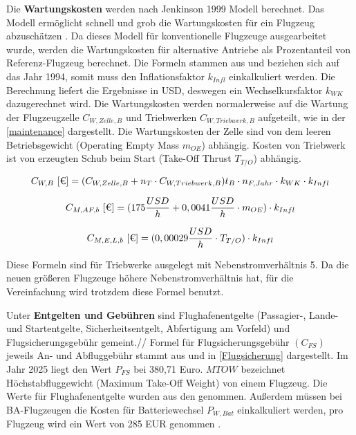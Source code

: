 Die \textbf{Wartungskosten} werden nach Jenkinson 1999 Modell berechnet. Das Modell ermöglicht schnell und grob die Wartungskosten 
für ein Flugzeug abzuschätzen \cite{bruge2018wartungskosten}.
Da dieses Modell für konventionelle Flugzeuge ausgearbeitet wurde, werden die Wartungskosten für alternative Antriebe
als Prozentanteil von Referenz-Flugzeug berechnet. 
Die Formeln stammen aus \cite{bruge2018wartungskosten} und beziehen sich auf das Jahr 1994, somit muss den Inflationsfaktor $k_{Infl}$
einkalkuliert werden. Die Berechnung liefert die Ergebnisse in USD, deswegen ein Wechselkursfaktor $k_{WK}$ dazugerechnet wird.
Die Wartungskosten werden normalerweise auf die Wartung der Flugzeugzelle $C_{W,Zelle,B}$ und Triebwerken 
$C_{W,Triebwerk,B}$ aufgeteilt, wie in der \eqref{maintenance} dargestellt. Die Wartungskosten der Zelle sind von dem leeren Betriebsgewicht 
(Operating Empty Mass $m_{OE}$) abhängig. Kosten von Triebwerk ist von erzeugten Schub beim Start (Take-Off Thrust $T_{T/O}$) abhängig.

\begin{equation}
   {C_{W,B} ~[\text{€}]} = (C_{W,Zelle,B} + n_{T} \cdot C_{W,Triebwerk,B} ) t_{B} \cdot n_{F, Jahr} \cdot k_{WK} \cdot k_{Infl}\\
   \label{maintenance}
\end{equation}

\begin{equation}
   {C_{M,AF,b} ~[\text{€}]} = (175 \frac{USD}{h} + 0,0041 \frac{USD}{h} \cdot m_{OE} )\cdot k_{Infl}\\
   \label{maintenance Zelle}
\end{equation}

\begin{equation}
   {C_{M,E,L,b} ~[\text{€}]} = (0,00029 \frac{USD}{h} \cdot T_{T/O} )\cdot k_{Infl}\\
   \label{maintenance engine}
\end{equation}

Diese Formeln sind für Triebwerke ausgelegt mit Nebenstromverhältnis 5. Da die neuen größeren Flugzeuge höhere Nebenstromverhältnis hat,
für die Vereinfachung wird trotzdem diese Formel benutzt.


Unter \textbf{Entgelten und Gebühren} sind Flughafenentgelte (Passagier-, Lande- und Startentgelte, Sicherheitsentgelt, Abfertigung am 
Vorfeld) und Flugsicherungsgebühr gemeint.//
Formel für Flugsicherungsgebühr $(C_{FS})$ jeweils An- und Abfluggebühr stammt aus \cite{dfs_flugsicherungsgebuehren} und in \eqref{Flugsicherung}
dargestellt. Im Jahr 2025 liegt den Wert $P_{FS}$ bei 380,71 Euro. $MTOW$ bezeichnet Höchstabfluggewicht (Maximum Take-Off Weight) 
von einem Flugzeug. Die Werte für Flughafenentgelte wurden aus den \cite{fraport2025entgelte} genommen.
Außerdem müssen bei BA-Flugzeugen die Kosten für
Batteriewechsel $P_{W,Bat}$ einkalkuliert werden, pro Flugzeug wird ein Wert von 285 EUR genommen \cite{guo2023infrastructure}.

